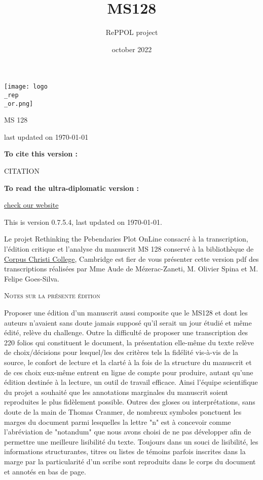 \documentclass[12pt, a4paper]{book}
\title{MS128}
\author{RePPOL project}
\date{october 2022}
\begin{document}
\begin{titlepage}
\texttt{[image: logo\\\_rep\\\_or.png]}
\begin{center}
\textsc{\huge MS 128}


last updated on \today

\end{center}
\vspace{4cm}{}{}
\textbf{To cite this version :}

CITATION

\textbf{To read the ultra-diplomatic version :}

\href{https://reppol.meshs.fr/}{check our website}
\vspace{2cm}{}{}

\begin{center}
This is version 0.7.5.4, last updated on \today.

\end{center}
\begin{multicols}{2}
Le projet Rethinking the Pebendaries Plot OnLine consacré à la transcription, l’édition critique et l’analyse du manuscrit MS 128 conservé à la bibliothèque de \href{https://parker.stanford.edu/parker/catalog/ps908cx9813}{Corpus Christi College}, Cambridge est fier de vous présenter cette version pdf des transcriptions réalisées par Mme Aude de Mézerac-Zaneti, M. Olivier Spina et M. Felipe Goes-Silva.
\end{multicols}
\end{titlepage}
\begin{center}
\vspace{3cm}{}{}
\scshape{\large Notes sur la présente édition}
\end{center}
Proposer une édition d'un manuscrit aussi composite que le MS128 et dont les auteurs n'avaient sans doute jamais supposé qu'il serait un jour étudié et même édité, relève du challenge. Outre la difficulté de proposer une transcription des 220 folios qui constituent le document, la présentation elle-même du texte relève de choix/décisions pour lesquel/les des critères tels la fidélité vis-à-vis de la source, le confort de lecture et la clarté à la fois de la structure du manuscrit et de ces choix eux-même entrent en ligne de compte pour produire, autant qu'une édition destinée à la lecture, un outil de travail efficace.
Ainsi l'équipe scientifique du projet a souhaité que les annotations marginales du manuscrit soient reproduites le plus fidèlement possible. Outres des gloses ou interprétations, sans doute de la main de Thomas Cranmer, de nombreux symboles ponctuent les marges du document parmi lesquelles la lettre "n" est à concevoir comme l’abréviation de "notandum" que nous avons choisi de ne pas développer afin de permettre une meilleure lisibilité du texte. Toujours dans un souci de lisibilité, les informations structurantes, titres ou listes de témoins parfois inscrites dans la marge par la particularité d'un scribe sont reproduits dans le corps du document et annotés en bas de page.
\end{document}
